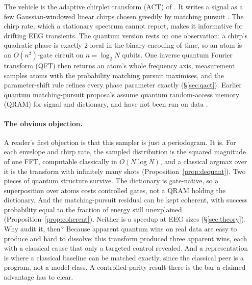 \documentclass{article}
\newcommand{\act}{ACT}
\begin{document}
The vehicle is the adaptive chirplet transform (\act) of \citet{mann1991chirplet,mann1992adaptive,mann1995chirplet}. It writes a signal as a few Gaussian-windowed linear chirps chosen greedily by matching pursuit \citep{mallat1993matching,bultan1999four}. The chirp rate, which a stationary spectrum cannot report, makes it informative for drifting EEG transients. The quantum version rests on one observation: a chirp's quadratic phase is exactly 2-local in the binary encoding of time, so an atom is an $O(n^2)$-gate circuit on $n=\log_2N$ qubits. One inverse quantum Fourier transform (QFT) then returns an atom's whole frequency axis, measurement samples atoms with the probability matching pursuit maximises, and the parameter-shift rule refines every phase parameter exactly (\S\ref{sec:qact}). Earlier quantum matching-pursuit proposals assume quantum random-access memory (QRAM) for signal and dictionary, and have not been run on data \citep{bellante2022qmp,bellante2025qomp}.

\paragraph{The obvious objection.} A reader's first objection is that this sampler is just a periodogram. It is. For each envelope and chirp rate, the sampled distribution is the squared magnitude of one FFT, computable classically in $O(N\log N)$, and a classical argmax over it is the transform with infinitely many shots (Proposition~\ref{prop:dequant}). Two pieces of quantum structure survive. The dictionary is gate-native, so a superposition over atoms costs controlled gates, not a QRAM holding the dictionary. And the matching-pursuit residual can be kept coherent, with success probability equal to the fraction of energy still unexplained (Proposition~\ref{prop:coherent}). Neither is a speedup at EEG sizes (\S\ref{sec:theory}). Why audit it, then? Because apparent quantum wins on real data are easy to produce and hard to dissolve: this transform produced three apparent wins, each with a classical cause that only a targeted control revealed. And a representation is where a classical baseline can be matched exactly, since the classical peer is a program, not a model class. A controlled parity result there is the bar a claimed advantage has to clear.
\end{document}
